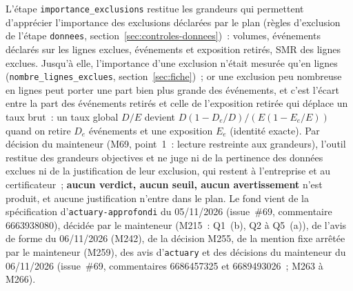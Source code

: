 \documentclass[a4paper,11pt]{article}
\newcommand{\code}[1]{\texttt{\small #1}}
\begin{document}
{\sloppy{}
L'étape \code{importance\_exclusions} restitue les grandeurs qui permettent
d'apprécier l'importance des exclusions déclarées par le plan (règles
d'exclusion de l'étape \code{donnees}, section~\ref{sec:controles-donnees})~:
volumes, événements déclarés sur les lignes exclues, événements et exposition
retirés, SMR des lignes exclues. Jusqu'à elle, l'importance d'une exclusion
n'était mesurée qu'en lignes (\code{nombre\_lignes\_exclues},
section~\ref{sec:fiche})~; or une exclusion peu nombreuse en lignes peut
porter une part bien plus grande des événements, et c'est l'écart entre la
part des événements retirés et celle de l'exposition retirée qui déplace un
taux brut~: un taux global $D/E$ devient $D(1 - D_e/D) / (E(1 - E_e/E))$
quand on retire $D_e$ événements et une exposition $E_e$ (identité exacte).
Par décision du mainteneur (M69, point~1~: lecture restreinte aux
grandeurs), l'outil restitue des grandeurs objectives et ne juge ni de la
pertinence des données exclues ni de la justification de leur exclusion,
qui restent à l'entreprise et au certificateur~; \textbf{aucun verdict,
aucun seuil, aucun avertissement} n'est produit, et aucune justification
n'entre dans le plan. Le fond vient de la spécification
d'\code{actuary-approfondi} du 05/11/2026 (issue~\#69, commentaire
6663938080), décidée par le mainteneur (M215~: Q1~(b), Q2 à Q5~(a)), de
l'avis de forme du 06/11/2026 (M242), de la décision M255, de la mention
fixe arrêtée par le mainteneur (M259), des avis d'\code{actuary} et des
décisions du mainteneur du 06/11/2026 (issue~\#69, commentaires 6686457325
et 6689493026~; M263 à M266).

}
\end{document}
